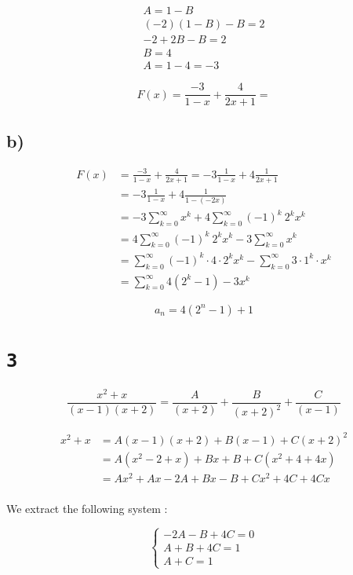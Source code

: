 \documentclass[a4paper,11pt]{report}
\begin{document}
\begin{gather*}
  A = 1 - B \\
  (-2)(1-B) - B  = 2 \\
  -2 + 2B -B = 2 \\
  B = 4 \\
  A = 1 - 4 = -3
\end{gather*}

\[
  F(x) = \frac{-3}{1-x} + \frac{4}{2x+1} =
\]

\subsection*{b)}

\begin{align*}
  F(x) &= \frac{-3}{1-x} + \frac{4}{2x+1} = -3 \frac{1}{1-x} + 4 \frac{1}{2x+1} \\
       &= -3 \frac{1}{1-x} + 4 \frac{1}{1-(-2x)} \\
       &= -3 \sum_{k=0}^{\infty} x^k + 4 \sum_{k=0}^{\infty} (-1)^k\ 2^kx^k \\
       &= 4 \sum_{k=0}^{\infty} (-1)^k\ 2^kx^k - 3 \sum_{k=0}^{\infty} x^k \\
       &= \sum_{k=0}^{\infty} (-1)^k \cdot 4 \cdot 2^kx^k - \sum_{k=0}^{\infty} 3 \cdot 1^k \cdot x^k \\
       &= \sum_{k=0}^{\infty} 4(2^k-1) - 3 x^k
\end{align*}

\[
  a_n = 4(2^n - 1) + 1
\]

\section*{\texttt{3}}

\[
  \frac{x^2 + x}{(x-1)(x+2)} = \frac{A}{(x+2)} + \frac{B}{(x+2)^2} + \frac{C}{(x-1)}
\]

\begin{align*}
  x^2 + x &= A(x-1)(x+2) + B(x-1) + C(x+2)^2 \\
          &= A(x^2 -2 + x) + Bx + B + C(x^2 + 4 + 4x)\\
          &= Ax^2 + Ax - 2A + Bx -B+Cx^2 + 4C+ 4Cx\\
\end{align*}

We extract the following system :

\[
  \begin{cases}
    -2A - B + 4C = 0 \\
    A + B + 4C = 1 \\
    A + C = 1
  \end{cases}
\]
\end{document}

